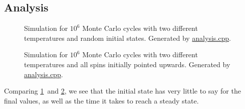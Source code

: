 \documentclass[12pt,english,a4paper]{article}
\newcommand{\program}[1]{\href{https://github.com/anjohan/Offentlig/blob/master/FYS3150/Oblig4/#1}{#1}}
\begin{document}
\subsection{Analysis}
\begin{figure}[H]
\centering
\caption{Simulation for \(10^6\) Monte Carlo cycles with two different temperatures and random initial states. Generated by \program{analysis.cpp}.}\label{2020random}
\end{figure}
\begin{figure}[H]
\centering
\caption{Simulation for \(10^6\) Monte Carlo cycles with two different temperatures and all spins initially pointed upwards. Generated by \program{analysis.cpp}.}\label{2020ordered}
\end{figure}
Comparing \ref{2020random} and \ref{2020ordered}, we see that the initial state has very little to say for the final values, as well as the time it takes to reach a steady state.






\clearpage
{}
\printbibliography
\end{document}
